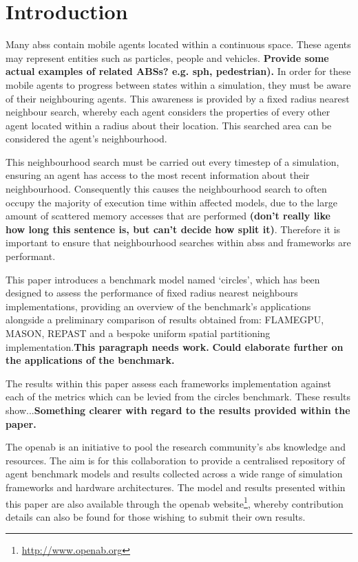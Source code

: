 
\section{Introduction}
  Many \glspl{abs} contain mobile agents located within a continuous space. These agents may represent entities such as particles, people and vehicles. \textbf{Provide some actual examples of related ABSs? e.g. sph, pedestrian).} In order for these mobile agents to progress between states within a simulation, they must be aware of their neighbouring agents. This awareness is provided by a fixed radius nearest neighbour search, whereby each agent considers the properties of every other agent located within a radius about their location. This searched area can be considered the agent's neighbourhood.
  
  This neighbourhood search must be carried out every timestep of a simulation, ensuring an agent has access to the most recent information about their neighbourhood. Consequently this causes the neighbourhood search to often occupy the majority of execution time within affected models, due to the large amount of scattered memory accesses that are performed \textbf{ (don't really like how long this sentence is, but can't decide how split it)}. Therefore it is important to ensure that neighbourhood searches within \glspl{abs} and frameworks are performant.
  
  This paper introduces a benchmark model named `circles', which has been designed to assess the performance of fixed radius nearest neighbours implementations, providing an overview of the benchmark's applications alongside a preliminary comparison of results obtained from: FLAMEGPU, MASON, REPAST and a bespoke uniform spatial partitioning implementation.\textbf{This paragraph needs work. }\textbf{Could elaborate further on the applications of the benchmark.}
  
  The results within this paper assess each frameworks implementation against each of the metrics which can be levied from the circles benchmark. These results show...\textbf{Something clearer with regard to the results provided within the paper.}
  
  The \gls{openab} is an initiative to pool the research community's \gls{abs} knowledge and resources. The aim is for this collaboration to provide a centralised repository of agent benchmark models and results collected across a wide range of simulation frameworks and hardware architectures. The model and results presented within this paper are also available through the \gls{openab} website\footnote{\url{http://www.openab.org}}, whereby contribution details can also be found for those wishing to submit their own results.
  
